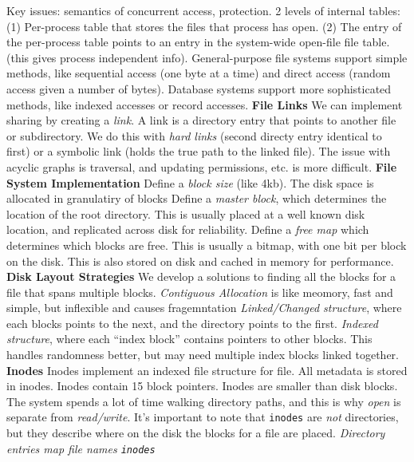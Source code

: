 Key issues: semantics of concurrent access, protection.
2 levels of internal tables: (1) Per-process table that stores the files that
process has open. (2) The entry of the per-process table points to an entry in
the system-wide open-file file table. (this gives process independent info).
General-purpose file systems support simple methods, like sequential
access (one byte at a time) and direct access (random access given a
number of bytes).
Database systems support more sophisticated methods, like indexed
accesses or record accesses.
{\bf File Links}
We can implement sharing by creating a \emph{link}. A link is a
directory entry that points to another file or subdirectory. We do this
with \emph{hard links} (second directy entry identical to first) or a
symbolic link (holds the true path to the linked file).
The issue with acyclic graphs is traversal, and updating permissions,
etc. is more difficult.
{\bf File System Implementation}
Define a \emph{block size} (like 4kb). The disk space is allocated in
granulatiry of blocks
Define a \emph{master block}, which determines the location of the root
directory. This is usually placed at a well known disk location, and
replicated across disk for reliability.
Define a \emph{free map} which determines which blocks are free. This is
usually a bitmap, with one bit per block on the disk. This is also
stored on disk and cached in memory for performance.
{\bf Disk Layout Strategies}
We develop a solutions to finding all the blocks for a file that spans multiple
blocks.  \emph{Contiguous Allocation} is like meomory, fast and simple, but
inflexible and causes fragemntation \emph{Linked/Changed structure}, where each
blocks points to the next, and the directory points to the first.
\emph{Indexed structure}, where each ``index block'' contains pointers to other
blocks. This handles randomness better, but may need multiple index blocks
linked together.
{\bf Inodes}
Inodes implement an indexed file structure for file.
All metadata is stored in inodes.
Inodes contain 15 block pointers.
Inodes are smaller than disk blocks.
The system spends a lot of time walking directory paths, and this is why
\emph{open} is separate from \emph{read/write}.
It's important to note that \texttt{inodes} are \emph{not} directories,
but they describe where on the disk the blocks for a file are placed.
\emph{Directory entries map file names \texttt{inodes}}
